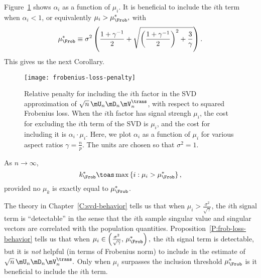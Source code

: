 Figure~\ref{F:frobenius-loss-penalty} shows $\alpha_i$ as a function of
$\mu_i$.  It is beneficial to include the $i$th term when $\alpha_i < 1$,
or equivalently
\(
    \mu_i
    >
    \mu_\Frob^\ast,
\)
with
\begin{equation}\label{E:frob-cutoff}
    \mu_\Frob^\ast
    \equiv
    \sigma^2
    \left(
    \frac{1 + \gamma^{-1}}{2}
    +
    \sqrt{ 
        \left( \frac{1 + \gamma^{-1} }{2} \right)^2
        +
        \frac{3}{\gamma}
    }
    \right).
\end{equation}
This gives us the next Corollary.

\begin{figure}[tbh]
    \centering
    \texttt{[image: frobenius-loss-penalty]}
    \caption{
        Relative penalty for including the $i$th factor in the SVD 
        approximation of $\sqrt{n} \, \mU_n \mD_n \mV_n^\trans$, with
        respect to squared Frobenius loss.  When the $i$th factor
        has signal strengh $\mu_i$, the cost for excluding the $i$th term
        of the SVD is $\mu_i$, and the cost for including it is 
        $\alpha_i \cdot \mu_i$.  Here, we plot $\alpha_i$ as a function
        of $\mu_i$ for various aspect ratios $\gamma = \frac{n}{p}$.
        The units are chosen so that $\sigma^2 = 1$.
    }\label{F:frobenius-loss-penalty}
\end{figure}

\begin{corollary}
    As $n\to\infty$,
    \[
        k^\ast_\Frob
            \toas
                \max \left\{ i : \mu_i > \mu_\Frob^\ast \right\},
    \]
    provided no $\mu_k$ is exactly equal to $\mu_\Frob^\ast$.
\end{corollary}

\noindent
The theory in Chapter~\ref{C:svd-behavior} tells us that when 
$\mu_i > \frac{\sigma^2}{\sqrt{\gamma}}$, the $i$th signal term
is ``detectable'' in the sense that the $i$th sample singular value and singular vectors are correlated with the population quantities.  Proposition~\ref{P:frob-loss-behavior} tells us that when 
\(
    \mu_i 
    \in 
    \left(
        \frac{\sigma^2}{\sqrt{\gamma}}, \, 
        \mu_\Frob^\ast
    \right),
\)
the $i$th signal term is detectable, but it is \emph{not} helpful (in terms
of Frobenius norm) to include in the estimate of
\(
    \sqrt{n} \, \mU_n \mD_n \mV_n^\trans.
\)
Only when $\mu_i$ surpasses the inclusion threshold $\mu_\Frob^\ast$ is it
beneficial to include the $i$th term.

